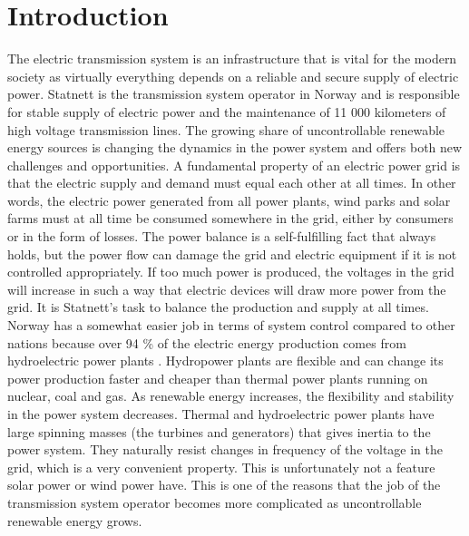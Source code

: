 \documentclass[class=book, crop=false, 11pt]{standalone}
\begin{document}
\chapter{Introduction}\label{chapter:introduction}
The electric transmission system is an infrastructure that is vital for the modern society as virtually everything depends on a reliable and secure supply of electric power. Statnett is the transmission system operator in Norway and is responsible for stable supply of electric power and the  maintenance of 11 000 kilometers of high voltage transmission lines. The growing share of uncontrollable renewable energy sources is changing the dynamics in the power system and offers both new challenges and opportunities. A fundamental property of an electric power grid is that the electric supply and demand must equal each other at all times. In other words, the electric power generated from all power plants, wind parks and solar farms must at all time be consumed somewhere in the grid, either by consumers or in the form of losses. The power balance is a self-fulfilling fact that always holds, but the power flow can damage the grid and electric equipment if it is not controlled appropriately. If too much power is produced, the voltages in the grid will increase in such a way that electric devices will draw more power from the grid. It is Statnett's task to balance the production and supply at all times. Norway has a somewhat easier job in terms of system control compared to other nations because over 94 \% of the electric energy production comes from hydroelectric power plants \cite{energifakta_norge}. Hydropower plants are flexible and can change its power production faster and cheaper than thermal power plants running on nuclear, coal and gas. As renewable energy increases, the flexibility and stability in the power system decreases. Thermal and hydroelectric power plants have large spinning masses (the turbines and generators) that gives inertia to the power system. They naturally resist changes in frequency of the voltage in the grid, which is a very convenient property. This is unfortunately not a feature solar power or wind power have. This is one of the reasons that the job of the transmission system operator becomes more complicated as uncontrollable renewable energy grows. 
\end{document}
